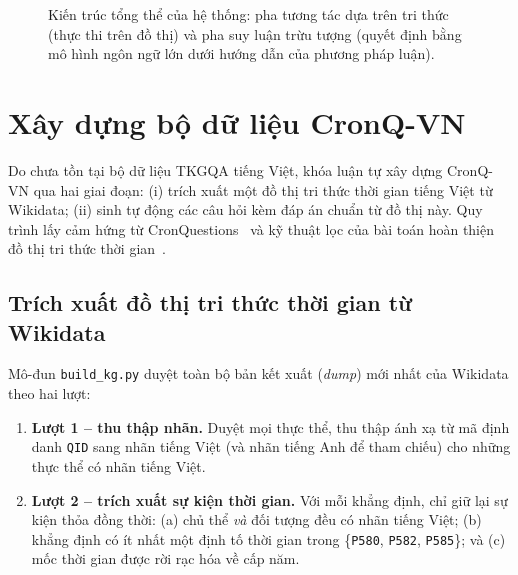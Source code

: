 \begin{figure}[ht]
  \centering
  \caption{Kiến trúc tổng thể của hệ thống: pha tương tác dựa trên tri thức (thực thi trên đồ thị)
  và pha suy luận trừu tượng (quyết định bằng mô hình ngôn ngữ lớn dưới hướng dẫn của phương pháp
  luận). }
  \label{fig:architecture}
\end{figure}

\section{Xây dựng bộ dữ liệu CronQ-VN}
\label{sec:cronqvn}

Do chưa tồn tại bộ dữ liệu TKGQA tiếng Việt, khóa luận tự xây dựng CronQ-VN qua hai giai đoạn: (i)
trích xuất một đồ thị tri thức thời gian tiếng Việt từ Wikidata; (ii) sinh tự động các câu hỏi kèm
đáp án chuẩn từ đồ thị này. Quy trình lấy cảm hứng từ CronQuestions~\cite{saxena2021cronkgqa} và kỹ
thuật lọc của bài toán hoàn thiện đồ thị tri thức thời gian~\cite{lacroix2020tkbc}.

\subsection{Trích xuất đồ thị tri thức thời gian từ Wikidata}
\label{sec:buildkg}

Mô-đun \texttt{build\_kg.py} duyệt toàn bộ bản kết xuất (\textit{dump}) mới nhất của Wikidata theo
hai lượt:

\begin{enumerate}
  \item \textbf{Lượt 1 -- thu thập nhãn.} Duyệt mọi thực thể, thu thập ánh xạ từ mã định danh
  \texttt{QID} sang nhãn tiếng Việt (và nhãn tiếng Anh để tham chiếu) cho những thực thể có nhãn
  tiếng Việt.
  \item \textbf{Lượt 2 -- trích xuất sự kiện thời gian.} Với mỗi khẳng định, chỉ giữ lại sự kiện
  thỏa đồng thời: (a) chủ thể \emph{và} đối tượng đều có nhãn tiếng Việt; (b) khẳng định có ít nhất
  một định tố thời gian trong \{\texttt{P580}, \texttt{P582}, \texttt{P585}\}; và (c) mốc thời gian
  được rời rạc hóa về cấp năm.
\end{enumerate}


